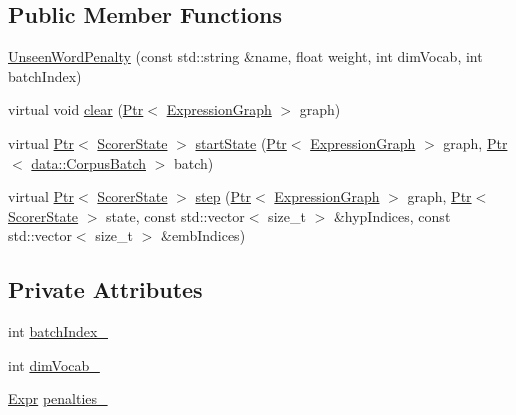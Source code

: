\subsection*{Public Member Functions}
\begin{DoxyCompactItemize}
\item 
\hyperlink{classmarian_1_1UnseenWordPenalty_afb5aa146f8abeb551cbe1721545d305f}{Unseen\+Word\+Penalty} (const std\+::string \&name, float weight, int dim\+Vocab, int batch\+Index)
\item 
virtual void \hyperlink{classmarian_1_1UnseenWordPenalty_a77573bbeb2cd9f40386132a780402387}{clear} (\hyperlink{namespacemarian_ad1a373be43a00ef9ce35666145137b08}{Ptr}$<$ \hyperlink{classmarian_1_1ExpressionGraph}{Expression\+Graph} $>$ graph)
\item 
virtual \hyperlink{namespacemarian_ad1a373be43a00ef9ce35666145137b08}{Ptr}$<$ \hyperlink{classmarian_1_1ScorerState}{Scorer\+State} $>$ \hyperlink{classmarian_1_1UnseenWordPenalty_a82b26a81ff8b5fa14747358ea82736f8}{start\+State} (\hyperlink{namespacemarian_ad1a373be43a00ef9ce35666145137b08}{Ptr}$<$ \hyperlink{classmarian_1_1ExpressionGraph}{Expression\+Graph} $>$ graph, \hyperlink{namespacemarian_ad1a373be43a00ef9ce35666145137b08}{Ptr}$<$ \hyperlink{classmarian_1_1data_1_1CorpusBatch}{data\+::\+Corpus\+Batch} $>$ batch)
\item 
virtual \hyperlink{namespacemarian_ad1a373be43a00ef9ce35666145137b08}{Ptr}$<$ \hyperlink{classmarian_1_1ScorerState}{Scorer\+State} $>$ \hyperlink{classmarian_1_1UnseenWordPenalty_a89e3992565f5452648813689ab329b25}{step} (\hyperlink{namespacemarian_ad1a373be43a00ef9ce35666145137b08}{Ptr}$<$ \hyperlink{classmarian_1_1ExpressionGraph}{Expression\+Graph} $>$ graph, \hyperlink{namespacemarian_ad1a373be43a00ef9ce35666145137b08}{Ptr}$<$ \hyperlink{classmarian_1_1ScorerState}{Scorer\+State} $>$ state, const std\+::vector$<$ size\+\_\+t $>$ \&hyp\+Indices, const std\+::vector$<$ size\+\_\+t $>$ \&emb\+Indices)
\end{DoxyCompactItemize}
\subsection*{Private Attributes}
\begin{DoxyCompactItemize}
\item 
int \hyperlink{classmarian_1_1UnseenWordPenalty_a03151d3a57f48ccdda4337d98a80cbf1}{batch\+Index\+\_\+}
\item 
int \hyperlink{classmarian_1_1UnseenWordPenalty_afe88c9dd2190a71ab2c214b60252b6b8}{dim\+Vocab\+\_\+}
\item 
\hyperlink{namespacemarian_a498d8baf75b754011078b890b39c8e12}{Expr} \hyperlink{classmarian_1_1UnseenWordPenalty_ac9cf380e25302b50550cee8a332ba17d}{penalties\+\_\+}
\end{DoxyCompactItemize}
